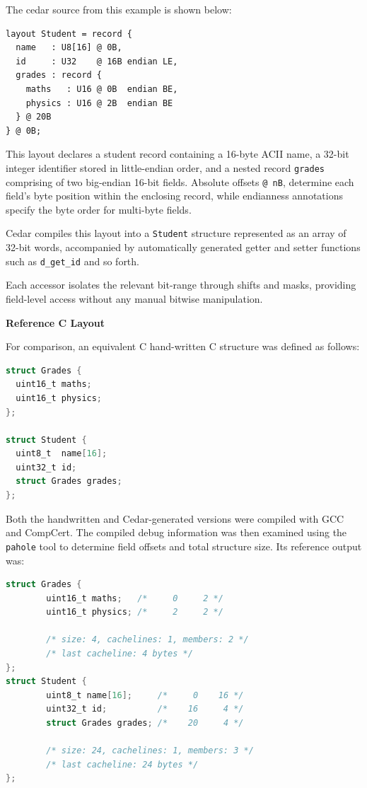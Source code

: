 The cedar source from this example is shown below:

\begin{verbatim}
layout Student = record {
  name   : U8[16] @ 0B,
  id     : U32    @ 16B endian LE,
  grades : record {
    maths   : U16 @ 0B  endian BE,
    physics : U16 @ 2B  endian BE
  } @ 20B
} @ 0B;
\end{verbatim}

This layout declares a student record containing a 16-byte ACII name,
a 32-bit integer identifier stored in little-endian order, and a
nested record \texttt{grades} comprising of two big-endian 16-bit
fields.
Absolute offsets \texttt{@ nB}, determine each field's byte position
within the enclosing record, while endianness annotations
specify the byte order for multi-byte fields.

Cedar compiles this layout into a \texttt{Student} structure
represented as an array of 32-bit words, accompanied by automatically
generated getter and setter functions such as \texttt{d\_get\_id} and so forth.

Each accessor isolates the relevant bit-range through shifts and masks,
providing field-level access without any manual bitwise manipulation.

\textbf{Reference C Layout}

For comparison, an equivalent C hand-written C structure was defined as follows:

\begin{lstlisting}[language=C, caption={Reference C structure for the Student layout}, label=lst:student_c]
struct Grades {
  uint16_t maths;
  uint16_t physics;
};

struct Student {
  uint8_t  name[16];
  uint32_t id;
  struct Grades grades;
};
\end{lstlisting}

Both the handwritten and Cedar-generated versions were compiled with GCC and 
CompCert.
The compiled debug information was then examined using the \texttt{pahole} 
tool to determine field offsets and total structure size.
Its reference output was:

\begin{lstlisting}[language=C, caption={Pahole output for the Student structure}, label=lst:student_pahole]
    struct Grades {
        uint16_t maths;   /*     0     2 */
        uint16_t physics; /*     2     2 */

        /* size: 4, cachelines: 1, members: 2 */
        /* last cacheline: 4 bytes */
};
struct Student {
        uint8_t name[16];     /*     0    16 */
        uint32_t id;          /*    16     4 */
        struct Grades grades; /*    20     4 */

        /* size: 24, cachelines: 1, members: 3 */
        /* last cacheline: 24 bytes */
};
\end{lstlisting}

